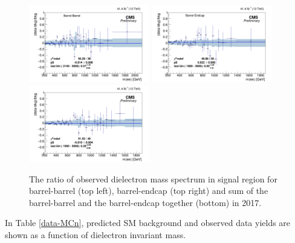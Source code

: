 \begin{figure}
  \begin{center}
    \includegraphics[width=0.47\textwidth]{figures/Zprime/2017/mass/SignalRegionHistEBEB}
    \includegraphics[width=0.47\textwidth]{figures/Zprime/2017/mass/SignalRegionHistEBEE}
    \includegraphics[width=0.47\textwidth]{figures/Zprime/2017/mass/SignalRegionHist}
    \caption{The ratio of observed dielectron mass spectrum in signal region for barrel-barrel (top left), barrel-endcap (top right) and sum of the barrel-barrel and the barrel-endcap together (bottom) in 2017.}
    \label{massratio_2017}
  \end{center}
\end{figure}



In Table \ref{data-MCn}, predicted SM background and observed data yields are shown as a function of dielectron invariant mass.

